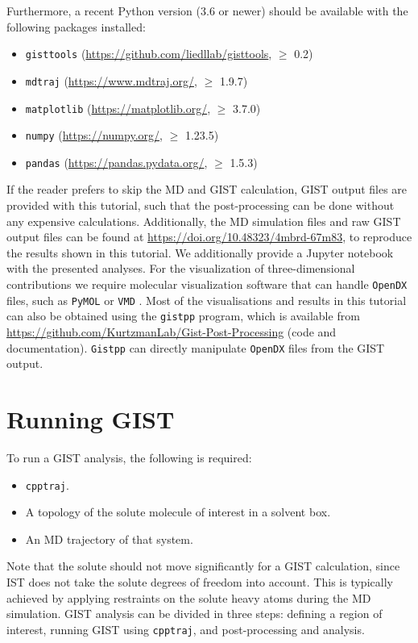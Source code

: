 \documentclass[9pt,tutorial]{livecoms}
\newcommand{\software}{\texttt}
\begin{document}
Furthermore, a recent Python version (3.6 or newer) should be available with the following packages installed:
\begin{itemize}
	\item \software{gisttools} (\url{https://github.com/liedllab/gisttools}, $\geq$ 0.2)
	\item \software{mdtraj} (\url{https://www.mdtraj.org/}, $\geq$ 1.9.7) \cite{McGibbon2015-mdtraj}
	\item \software{matplotlib} (\url{https://matplotlib.org/}, $\geq$ 3.7.0) \cite{Hunter2007-matplotlib}
	\item \software{numpy} (\url{https://numpy.org/}, $\geq$ 1.23.5) \cite{harris2020-numpy}
	\item \software{pandas} (\url{https://pandas.pydata.org/}, $\geq$ 1.5.3) \cite{pandas-2023_8239932,mckinney-proc-scipy-2010}
\end{itemize}
If the reader prefers to skip the MD and GIST calculation, GIST output files are provided with this tutorial, such that the post-processing can be done without any expensive calculations.
Additionally, the MD simulation files and raw GIST output files can be found at \url{https://doi.org/10.48323/4mbrd-67m83}, to reproduce the results shown in this tutorial.
We additionally provide a Jupyter notebook \cite{Kluyver2016-jupyter,Granger2021-jupyter} with the presented analyses. 
For the visualization of three-dimensional contributions we require molecular visualization software that can handle \software{OpenDX} files, such as \software{PyMOL} \cite{pymol} or \software{VMD} \cite{vmd}.
Most of the visualisations and results in this tutorial can also be obtained using the \software{gistpp} program, which is available from \url{https://github.com/KurtzmanLab/Gist-Post-Processing} (code and documentation).
\software{Gistpp} can directly manipulate \software{OpenDX} files from the GIST output. 
\pagebreak %
\section{Running GIST}
\label{sec:running_GIST}
To run a GIST analysis, the following is required:
\begin{itemize}
	\item \software{cpptraj}.
	\item A topology of the solute molecule of interest in a solvent box.
	\item An MD trajectory of that system.
\end{itemize}
Note that the solute should not move significantly for a GIST calculation, since IST does not take the solute degrees of freedom into account.
This is typically achieved by applying restraints on the solute heavy atoms during the MD simulation.
GIST analysis can be divided in three steps: defining a region of interest, running GIST using \software{cpptraj}, and post-processing and analysis.
\cite{Ramsey2016}
\end{document}
